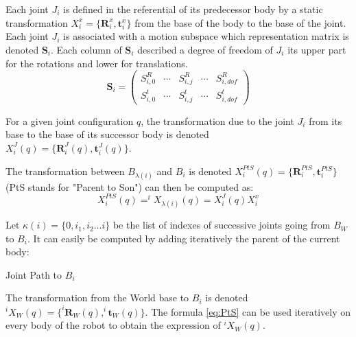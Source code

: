 Each joint $J_i$ is defined in the referential of its predecessor body by a static transformation $X^x_i = \{\mathbf{R}^x_i, \mathbf{t}^x_i\}$ from the base of the body to the base of the joint.
Each joint $J_i$ is associated with a motion subspace which representation matrix is denoted $\mathbf{S}_i$. Each column of $\mathbf{S}_i$ described a degree of freedom of $J_i$ its upper part for the rotations and lower for translations.
\begin{equation}
  \mathbf{S}_i =
  \begin{pmatrix}
    S^R_{i,0} & \cdots &
    S^R_{i,j} & \cdots &
    S^R_{i,dof} \\
    S^t_{i,0} & \cdots &
    S^t_{i,j} & \cdots &
    S^t_{i,dof}
  \end{pmatrix}
\end{equation}

For a given joint configuration $q$, the transformation due to the joint $J_i$ from its base to the base of its successor body is denoted \\$X^J_i(q) = \{\mathbf{R}^J_i(q), \mathbf{t}^J_i(q)\}$.

The transformation between $B_{\lambda(i)}$ and $B_i$ is denoted $X^{PtS}_i(q) = \{\mathbf{R}^{PtS}_i, \mathbf{t}^{PtS}_i\}$ (PtS stands for "Parent to Son") can then be computed as:
\begin{equation}
  X^{PtS}_i(q) = ^iX_{\lambda(i)}(q) = X^J_i(q) X^x_i
  \label{eq:PtS}
\end{equation}

Let $\kappa(i) =\{0, i_1, i_2 ... i\}$ be the list of indexes of successive joints going from $B_W$ to $B_i$.
It can easily be computed by adding iteratively the parent of the current body:

\begin{algorithm}
  \caption{Joint Path to $B_i$}
  \label{JP}
\begin{algorithmic}
  \EndWhile
\end{algorithmic}
\end{algorithm}

The transformation from the World base to $B_i$ is denoted \\ $^iX_W(q) = \{^i\mathbf{R}_W(q), ^i\mathbf{t}_W(q)\}$.
The formula \ref{eq:PtS} can be used iteratively on every body of the robot to obtain the expression of $^iX_W(q)$.

